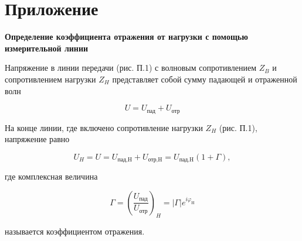 ﻿\documentclass[a4paper,11pt]{article}
\begin{document}
\section{Приложение}
\textbf{Определение коэффициента отражения от нагрузки с помощью измерительной линии}


Напряжение в линии передачи (рис. П.1) с волновым сопротивлением $Z_B$ и сопротивлением нагрузки $Z_H$ представляет собой сумму падающей и отраженной волн

\begin{equation}
	U=U_\text{пад}+U_\text{отр}
\end{equation}

На конце линии, где включено сопротивление нагрузки $Z_H$ (рис. П.1), напряжение равно

\begin{equation}
	U_H=U=U_\text{пад,H}+U_\text{отр,H}=U_\text{пад,H}(1+\Gamma),
\end{equation}

где комплексная величина

\begin{equation}
	\Gamma=\left(\frac{U_\text{пад}}{U_\text{отр}}\right)_H= | \Gamma | e ^ { i \varphi _ { \mathrm { H } } }
\end{equation}

называется коэффициентом отражения.
\end{document}
